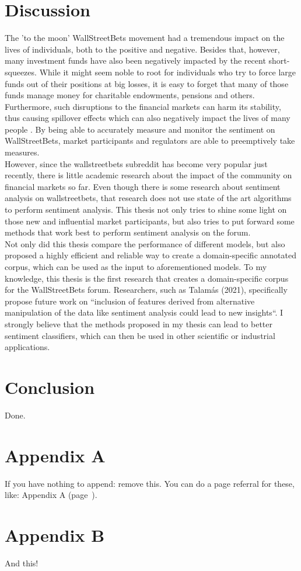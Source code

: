 \documentclass[11pt, a4paper]{article}
\begin{document}
\section{Discussion}


The 'to the moon' WallStreetBets movement had a tremendous impact on the lives of individuals, both to the positive and negative. 
Besides that, however, many investment funds have also been negatively impacted by the recent short-squeezes. 
While it might seem noble to root for individuals who try to force large funds out of their positions at big losses, it is easy to forget that many 
of those funds manage money for charitable endowments, pensions and others. 
Furthermore, such disruptions to the financial markets can harm its stability, thus causing spillover effects which can also negatively impact the 
lives of many people \citep{lyocsa2021yolotrading}.
By being able to accurately measure and monitor the sentiment on WallStreetBets, market participants and regulators are able to preemptively take measures.\\
However, since the wallstreetbets subreddit has become very popular just recently, there is little academic research about the impact of the community on 
financial markets so far. Even though there is some research about sentiment analysis on wallstreetbets, that research does not use state of the art algorithms to perform 
sentiment analysis. This thesis not only tries to shine some light on those new and influential market participants, but also tries to put forward some methods that work 
best to perform sentiment analysis on the forum. \\
Not only did this thesis compare the performance of different models, but also proposed a highly efficient and reliable way to create a domain-specific annotated corpus, 
which can be used as the input to aforementioned models. To my knowledge, this thesis is the first research that creates a domain-specific corpus for the WallStreetBets forum. 
Researchers, such as Talamás (2021), specifically propose future work on “inclusion of features derived from alternative manipulation of the data like sentiment analysis 
could lead to new insights“. I strongly believe that the methods proposed in my thesis can lead to better sentiment classifiers, 
which can then be used in other scientific or industrial applications.


\section{Conclusion}

Done.



\section*{Appendix A} \label{app:a}

If you have nothing to append: remove this. You can do a page referral for these, like: Appendix A (page~\pageref{app:a}).

\section*{Appendix B}

And this!
\end{document}
